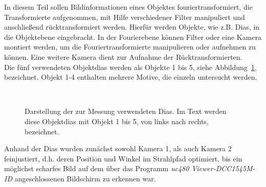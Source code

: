 
	In diesem Teil sollen Bildinformationen eines Objektes fouriertransformiert, die Transformierte aufgenommen, mit Hilfe verschiedener Filter manipuliert und anschließend rücktransformiert werden. Hierfür werden Objekte, wie z.B. Dias, in die Objektebene eingebracht. In der Fourierebene können  Filter oder eine Kamera montiert werden, um die Fouriertransformierte manipulieren oder aufnehmen zu können. Eine weitere Kamera dient zur Aufnahme der Rücktransformierten.\\
	
	Die fünf verwendeten Objektdias werden als Objekte 1 bis 5, siehe Abbildung~\ref{fig:Objekte-aus-Anleitungsheft}, bezeichnet. Objekt 1-4 enthalten mehrere Motive, die einzeln untersucht werden.
	
	\begin{figure}[h]
		\centering
		~~
		~~
		~~
		~~
		\caption[Die zur Messung verwendeten Diamotive]{
			Darstellung der zur Messung verwendeten Dias. Im Text werden diese Objektdias mit Objekt 1 bis 5, von links nach rechts, bezeichnet.
		}
		\label{fig:Objekte-aus-Anleitungsheft}
	\end{figure}
	
	Anhand der Dias wurden zunächst sowohl Kamera 1, als auch Kamera 2 feinjustiert, d.h. deren Position und Winkel im Strahlpfad optimiert, bis ein möglichst scharfes Bild auf dem über das Programm \textit{uc480 Viewer-DCC1545M-ID} angeschlossenen Bildschirm zu erkennen war. %



